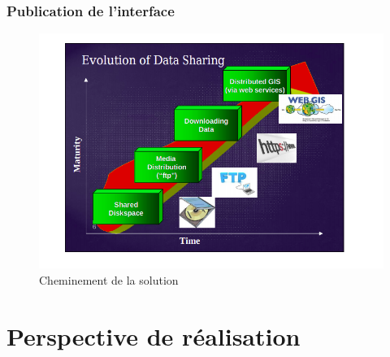         \subsubsection{Publication de l'interface}
            
    \begin{figure}[t]
        \centering
        \includegraphics[width=1\textwidth]{images/evolution_projetGIS.png}
        \caption{Cheminement de la solution}
    \end{figure}

\section{Perspective de réalisation}